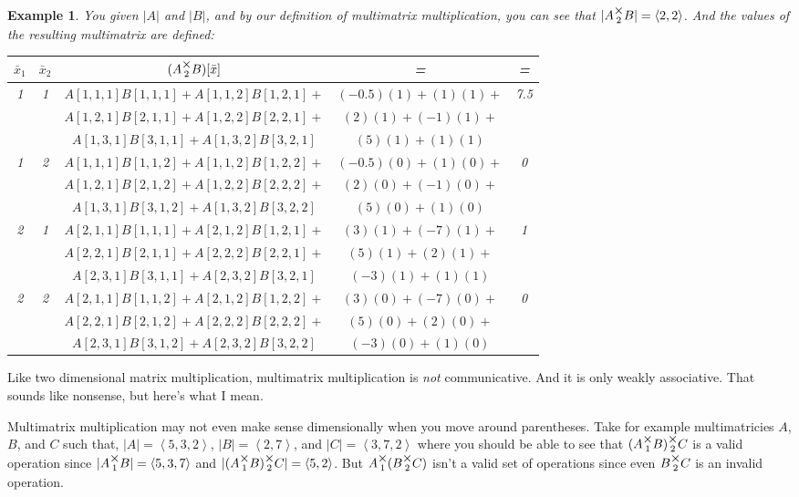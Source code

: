 \documentclass[12pt]{article}
\theoremstyle{definition}
\theoremstyle{plain}
\newtheorem{example}{Example}[section]
\theoremstyle{ppart}
\newcommand{\mmult}[1]{\text{\raisebox{1ex}{$\underset{#1}{\times}$}}}
\begin{document}
\begin{example}
You given $|A|$ and $|B|$, and by our definition of multimatrix multiplication,
you can see that $|A \mmult{2} B| = \left<2, 2\right>$. And the values of the
resulting multimatrix are defined:

\begin{table}[h!]
\begin{center}
\begin{tabular}{c c | c | c | c}
$\bar{x}_1$ & $\bar{x}_2$ & $(A \mmult{2} B)[\bar{x}]$ & = & = \\
\hline
1 & 1 &
  $A[1,1,1]B[1,1,1] + A[1,1,2]B[1,2,1] +$ & $(-0.5)(1) + (1)(1) +$ & 7.5 \\
&&$A[1,2,1]B[2,1,1] + A[1,2,2]B[2,2,1] +$ & $(2)(1) + (-1)(1) +$ & \\
&&$A[1,3,1]B[3,1,1] + A[1,3,2]B[3,2,1]$   & $(5)(1) + (1)(1)$ & \\
1 & 2 &
  $A[1,1,1]B[1,1,2] + A[1,1,2]B[1,2,2] +$ & $(-0.5)(0) + (1)(0) +$ & 0 \\
&&$A[1,2,1]B[2,1,2] + A[1,2,2]B[2,2,2] +$ & $(2)(0) + (-1)(0) +$ & \\
&&$A[1,3,1]B[3,1,2] + A[1,3,2]B[3,2,2]$   & $(5)(0) + (1)(0)$ & \\
2 & 1 &
  $A[2,1,1]B[1,1,1] + A[2,1,2]B[1,2,1] +$ & $(3)(1) + (-7)(1) +$ & 1 \\
&&$A[2,2,1]B[2,1,1] + A[2,2,2]B[2,2,1] +$ & $(5)(1) + (2)(1) +$ & \\
&&$A[2,3,1]B[3,1,1] + A[2,3,2]B[3,2,1]$   & $(-3)(1) + (1)(1)$ & \\
2 & 2 &
  $A[2,1,1]B[1,1,2] + A[2,1,2]B[1,2,2] +$ & $(3)(0) + (-7)(0) +$ & 0 \\
&&$A[2,2,1]B[2,1,2] + A[2,2,2]B[2,2,2] +$ & $(5)(0) + (2)(0) +$ & \\
&&$A[2,3,1]B[3,1,2] + A[2,3,2]B[3,2,2]$   & $(-3)(0) + (1)(0)$ &
\end{tabular}
\end{center}
\end{table}

\end{example}
\newpage

Like two dimensional matrix multiplication, multimatrix multiplication is
\textit{not} communicative. And it is only weakly associative. That sounds like
nonsense, but here's what I mean.

Multimatrix multiplication may not even make sense dimensionally when you move
around parentheses. Take for example multimatricies $A$, $B$, and $C$ such that,
$|A| = \left<5,3,2\right>$,
$|B| = \left<2,7\right>$, and
$|C| = \left<3,7,2\right>$ where you should be able to see that
$(A \mmult{1} B) \mmult{2} C$ is a valid operation since
$|A \mmult{1} B| = \left<5,3,7\right>$ and
$|(A \mmult{1} B) \mmult{2} C| = \left<5,2\right>$. But
$A \mmult{1} (B \mmult{2} C)$ isn't a valid set of operations since even
$B \mmult{2} C$ is an invalid operation.
\end{document}

